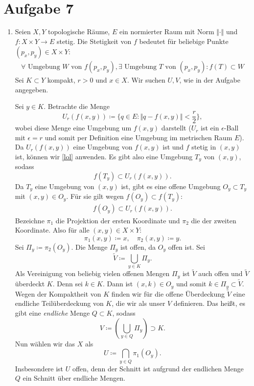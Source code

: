 \documentclass[a4paper,fontsize=8pt,DIV=1]{article}
\theoremstyle{plain}
\begin{document}
\section*{Aufgabe 7}
\begin{enumerate}[label=(\roman*)]
	\item Seien $X,Y$ topologische Räume, $E$ ein normierter Raum mit Norm $\Vert \cdot \Vert$ und $f: X \times Y \to E$ stetig. Die Stetigkeit von $f$ bedeutet für beliebige Punkte $(p_x,p_y) \in X \times Y$: 
	\begin{align}\label{lol}
		\forall \text{ Umgebung $W$ von $f(p_x,p_y)$}, \exists  \text{ Umgebung $T$ von $(p_x,p_y)$}: f(T) \subset W
	\end{align}
	Sei $K \subset Y$ kompakt, $r > 0$ und $x \in X$. Wir suchen $U, V$, wie in der Aufgabe angegeben.
	
	Sei $y \in K$. Betrachte die Menge 
	\[
		U_r(f(x,y)) \coloneqq \{ q \in E :  \Vert q - f(x,y) \Vert < \frac{r}{2} \},
	\]
	wobei diese Menge eine Umgebung um $f(x,y)$ darstellt ($U_r$ ist ein $\epsilon$-Ball mit $\epsilon = r$ und somit per Definition eine Umgebung im metrischen Raum $E$). Da $U_r(f(x,y))$ eine Umgebung von $f(x,y)$ ist und $f$ stetig in $(x,y)$ ist, können wir \eqref{lol} anwenden. Es gibt also eine Umgebung $T_{y}$ von $(x,y)$, sodass
	\[
		f(T_{y}) \subset U_r(f(x,y)).
	\]
	Da $T_y$ eine Umgebung von $(x,y)$ ist, gibt es eine offene Umgebung $O_y \subset T_y$ mit $(x,y) \in O_y$. Für sie gilt wegen $f(O_{y}) \subset f(T_{y})$:
	\begin{align}\label{manno}
		f(O_{y}) \subset U_r(f(x,y)).
	\end{align}
	Bezeichne $\pi_1$ die Projektion der ersten Koordinate und $\pi_2$ die der zweiten Koordinate. Also für alle $(x,y) \in X \times Y$:
	\[
		\pi_1(x,y) \coloneqq x, \quad \pi_2(x,y)\coloneqq y.
	\]
	Sei $\Pi_y \coloneqq \pi_2(O_y)$. Die Menge $\Pi_y$ ist offen, da $O_y$ offen ist. Sei
	\[
		\tilde V \coloneqq \bigcup_{y \in K}\Pi_y.
	\]
	Als Vereinigung von beliebig vielen offenen Mengen $\Pi_y$ ist $\tilde V$ auch offen und $\tilde V$ überdeckt $K$. Denn sei $k \in K$. Dann ist $(x,k) \in O_y$ und somit $k \in \Pi_y \subset \tilde V$. Wegen der Kompaktheit von $K$ finden wir für die offene Überdeckung $\tilde V$ eine endliche Teilüberdeckung von $K$, die wir als unser $V$ definieren. Das heißt, es gibt eine \emph{endliche} Menge $Q \subset K$, sodass
	\[
		V \coloneqq (\bigcup_{y \in Q}\Pi_y) \supset K.
	\]
	Nun wählen wir das $X$ als
	\[
		U \coloneqq \bigcap_{y \in Q} \pi_1(O_y).
	\]
	Insbesondere ist $U$ offen, denn der Schnitt ist aufgrund der endlichen Menge $Q$ ein Schnitt über endliche Mengen.
	

\end{enumerate}
\end{document}

